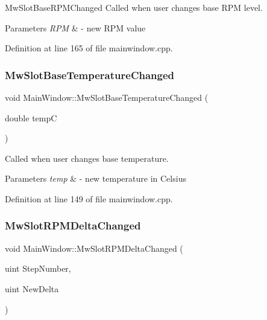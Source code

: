 Mw\+Slot\+Base\+R\+P\+M\+Changed Called when user changes base R\+PM level. 


\begin{DoxyParams}{Parameters}
{\em R\+PM} & -\/ new R\+PM value \\
\hline
\end{DoxyParams}


Definition at line 165 of file mainwindow.\+cpp.

\mbox{\label{class_main_window_a0a690287dffb47b6477f2fb50c2a818e}} 
\subsubsection{\texorpdfstring{Mw\+Slot\+Base\+Temperature\+Changed}{MwSlotBaseTemperatureChanged}}
{\footnotesize\ttfamily void Main\+Window\+::\+Mw\+Slot\+Base\+Temperature\+Changed (\begin{DoxyParamCaption}\item[{double}]{tempC }\end{DoxyParamCaption})\hspace{0.3cm}{\ttfamily [slot]}}



Called when user changes base temperature. 


\begin{DoxyParams}{Parameters}
{\em temp} & -\/ new temperature in Celsius \\
\hline
\end{DoxyParams}


Definition at line 149 of file mainwindow.\+cpp.

\mbox{\label{class_main_window_a32b3a311b7151092db3ec0756d2c22d4}} 
\subsubsection{\texorpdfstring{Mw\+Slot\+R\+P\+M\+Delta\+Changed}{MwSlotRPMDeltaChanged}}
{\footnotesize\ttfamily void Main\+Window\+::\+Mw\+Slot\+R\+P\+M\+Delta\+Changed (\begin{DoxyParamCaption}\item[{uint}]{Step\+Number,  }\item[{uint}]{New\+Delta }\end{DoxyParamCaption})\hspace{0.3cm}{\ttfamily [slot]}}




